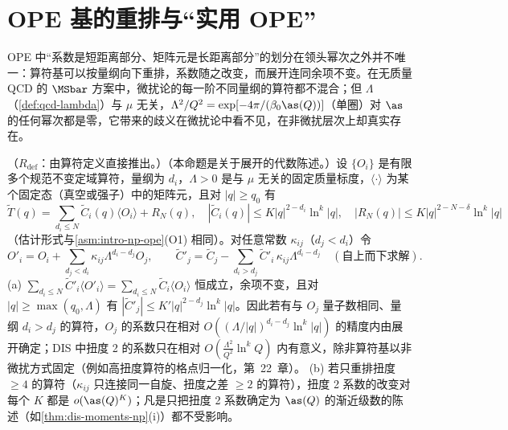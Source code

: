 \section{OPE 基的重排与“实用 OPE”}\label{sec:power-ope-basis}

OPE 中“系数是短距离部分、矩阵元是长距离部分”的划分在领头幂次之外并不唯一：算符基可以按量纲向下重排，系数随之改变，而展开连同余项不变。在无质量 QCD 的 $\MSbar$ 方案中，微扰论的每一阶不同量纲的算符都不混合；但 $\Lambda$（\cref{def:qcd-lambda}）与 $\mu$ 无关，$\Lambda^2/Q^2=\exp[-4\pi/(\beta_0\as(Q))]$（单圈）对 $\as$ 的任何幂次都是零，它带来的歧义在微扰论中看不见，在非微扰层次上却真实存在。

\begin{proposition}\label{prop:power-rearrangement}
（$R_{\mathrm{def}}$：由算符定义直接推出。）（本命题是关于展开的代数陈述。）设 $\{O_i\}$ 是有限多个规范不变定域算符，量纲为 $d_i$，$\Lambda>0$ 是与 $\mu$ 无关的固定质量标度，$\langle\cdot\rangle$ 为某个固定态（真空或强子）中的矩阵元，且对 $|q|\ge q_0$ 有
\begin{equation}\label{eq:power-ope-N}
\tilde T(q)=\sum_{d_i\le N}\tilde C_i(q)\langle O_i\rangle+R_N(q),\quad
|\tilde C_i(q)|\le K|q|^{2-d_i}\ln^k|q|,\quad |R_N(q)|\le K|q|^{2-N-\delta}\ln^k|q|
\end{equation}
（估计形式与\cref{asm:intro-np-ope}(O1) 相同）。对任意常数 $\kappa_{ij}$（$d_j<d_i$）令
\begin{equation}\label{eq:power-rearr}
O'_i=O_i+\sum_{d_j<d_i}\kappa_{ij}\Lambda^{d_i-d_j}O_j,\qquad
\tilde C'_j=\tilde C_j-\sum_{d_i>d_j}\tilde C'_i\,\kappa_{ij}\Lambda^{d_i-d_j}\quad(\text{自上而下求解}).
\end{equation}
(a) $\sum_{d_i\le N}\tilde C'_i\langle O'_i\rangle=\sum_{d_i\le N}\tilde C_i\langle O_i\rangle$ 恒成立，余项不变，且对 $|q|\ge\max(q_0,\Lambda)$ 有 $|\tilde C'_j|\le K'|q|^{2-d_j}\ln^k|q|$。因此若有与 $O_j$ 量子数相同、量纲 $d_i>d_j$ 的算符，$O_j$ 的系数只在相对 $O((\Lambda/|q|)^{d_i-d_j}\ln^k|q|)$ 的精度内由展开确定；DIS 中扭度 2 的系数只在相对 $O(\frac{\Lambda^2}{Q^2}\ln^kQ)$ 内有意义，除非算符基以非微扰方式固定（例如高扭度算符的格点归一化，第~22~章）。
(b) 若只重排扭度 $\ge4$ 的算符（$\kappa_{ij}$ 只连接同一自旋、扭度之差 $\ge2$ 的算符），扭度 2 系数的改变对每个 $K$ 都是 $o(\as(Q)^K)$；凡是只把扭度 2 系数确定为 $\as(Q)$ 的渐近级数的陈述（如\cref{thm:dis-moments-np}(i)）都不受影响。
\end{proposition}

